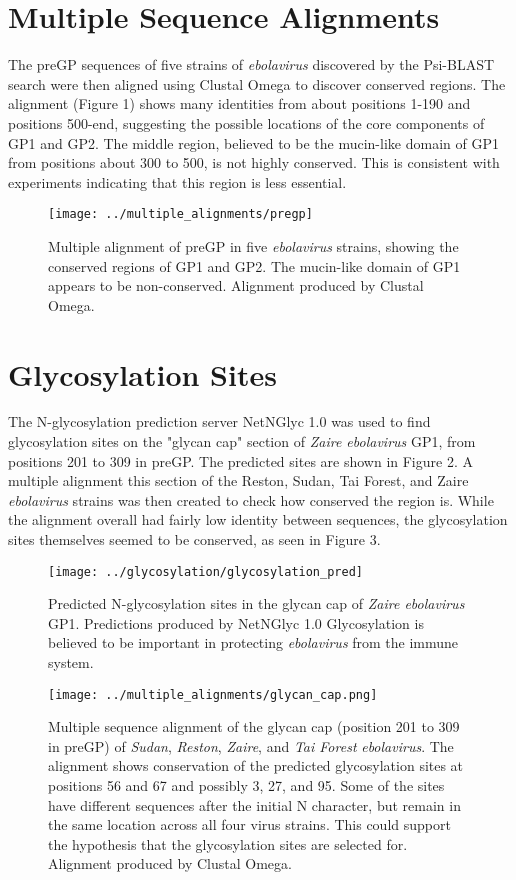 \documentclass[a4paper,12pt]{article}
\begin{document}
\section{Multiple Sequence Alignments}
The preGP sequences of five strains of \textit{ebolavirus} discovered by the Psi-BLAST search were then aligned using Clustal Omega\cite{pmid21988835} to discover conserved regions. The alignment (Figure 1) shows many identities from about positions 1-190 and positions 500-end, suggesting the possible locations of the core components of GP1 and GP2. The middle region, believed to be the mucin-like domain of GP1 from positions about 300 to 500, is not highly conserved. This is consistent with experiments indicating that this region is less essential.\cite{pmid24473128}
\begin{figure}
\texttt{[image: ../multiple\_alignments/pregp]}
\caption{Multiple alignment of preGP in five \textit{ebolavirus} strains, showing the conserved regions of GP1 and GP2. The mucin-like domain of GP1 appears to be non-conserved. Alignment produced by Clustal Omega. \cite{pmid21988835}}
\end{figure}
\section{Glycosylation Sites}
The N-glycosylation prediction server NetNGlyc 1.0 was used to find glycosylation sites on the "glycan cap" section of \textit{Zaire ebolavirus} GP1, from positions 201 to 309 in preGP. The predicted sites are shown in Figure 2. A multiple alignment this section of the Reston, Sudan, Tai Forest, and Zaire \textit{ebolavirus} strains was then created to check how conserved the region is. While the alignment overall had fairly low identity between sequences, the glycosylation sites themselves seemed to be conserved, as seen in Figure 3. \cite{netNGlyc}
\begin{figure}
\texttt{[image: ../glycosylation/glycosylation\_pred]}
\caption{Predicted N-glycosylation sites in the glycan cap of \textit{Zaire ebolavirus} GP1. Predictions produced by NetNGlyc 1.0 \cite{netNGlyc} Glycosylation is believed to be important in protecting \textit{ebolavirus} from the immune system.}
\end{figure}
\begin{figure}
\texttt{[image: ../multiple\_alignments/glycan\_cap.png]}
\caption{Multiple sequence alignment of the glycan cap (position 201 to 309 in preGP) of \textit{Sudan}, \textit{Reston}, \textit{Zaire}, and \textit{Tai Forest} \textit{ebolavirus}. The alignment shows conservation of the predicted glycosylation sites at positions 56 and 67 and possibly 3, 27, and 95. Some of the sites have different sequences after the initial N character, but remain in the same location across all four virus strains. This could support the hypothesis that the glycosylation sites are selected for. Alignment produced by Clustal Omega.\cite{pmid21988835}}
\end{figure}
\end{document}
